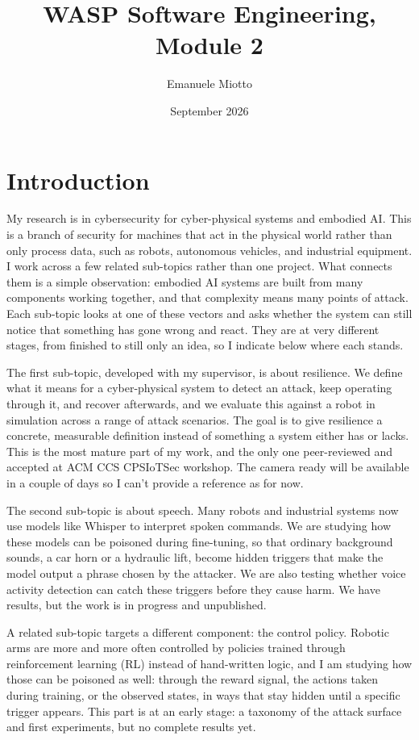 \documentclass[11pt,a4paper]{article}
\title{WASP Software Engineering, Module 2}
\author{Emanuele Miotto}
\date{September 2026}
\begin{document}
\maketitle


\section{Introduction}


My research is in cybersecurity for cyber-physical systems and embodied AI. This is a branch of security for machines that act in the physical world rather than only process data, such as robots, autonomous vehicles, and industrial equipment. I work across a few related sub-topics rather than one project. What connects them is a simple observation: embodied AI systems are built from many components working together, and that complexity means many points of attack. Each sub-topic looks at one of these vectors and asks whether the system can still notice that something has gone wrong and react. They are at very different stages, from finished to still only an idea, so I indicate below where each stands.

The first sub-topic, developed with my supervisor, is about resilience. We define what it means for a cyber-physical system to detect an attack, keep operating through it, and recover afterwards, and we evaluate this against a robot in simulation across a range of attack scenarios. The goal is to give resilience a concrete, measurable definition instead of something a system either has or lacks. This is the most mature part of my work, and the only one peer-reviewed and accepted at ACM CCS CPSIoTSec workshop. The camera ready will be available in a couple of days so I can't provide a reference as for now.

The second sub-topic is about speech. Many robots and industrial systems now use models like Whisper to interpret spoken commands. We are studying how these models can be poisoned during fine-tuning, so that ordinary background sounds, a car horn or a hydraulic lift, become hidden triggers that make the model output a phrase chosen by the attacker. We are also testing whether voice activity detection can catch these triggers before they cause harm. We have results, but the work is in progress and unpublished.

A related sub-topic targets a different component: the control policy. Robotic arms are more and more often controlled by policies trained through reinforcement learning (RL) instead of hand-written logic, and I am studying how those can be poisoned as well: through the reward signal, the actions taken during training, or the observed states, in ways that stay hidden until a specific trigger appears. This part is at an early stage: a taxonomy of the attack surface and first experiments, but no complete results yet.
\end{document}
